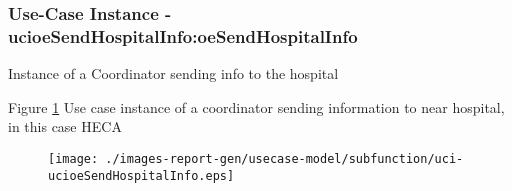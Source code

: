 \subsubsection{Use-Case Instance - ucioeSendHospitalInfo:oeSendHospitalInfo}

Instance of a Coordinator sending info to the hospital		  
\begin{operationmodel}

\end{operationmodel} 

Figure \ref{fig:lu.uni.lassy.excalibur.examples.icrash-RE-UC-uci-ucioeSendHospitalInfo}
Use case instance of a coordinator sending information to near hospital, 
in this case HECA

\begin{figure}[htbp]
\begin{center}

\texttt{[image: ./images-report-gen/usecase-model/subfunction/uci-ucioeSendHospitalInfo.eps]}
\end{center}
\caption[lu.uni.lassy.excalibur.examples.icrash Sequence Diagram: uci-ucioeSendHospitalInfo]{}
\label{fig:lu.uni.lassy.excalibur.examples.icrash-RE-UC-uci-ucioeSendHospitalInfo}
\end{figure}
\vspace{0.5cm}
